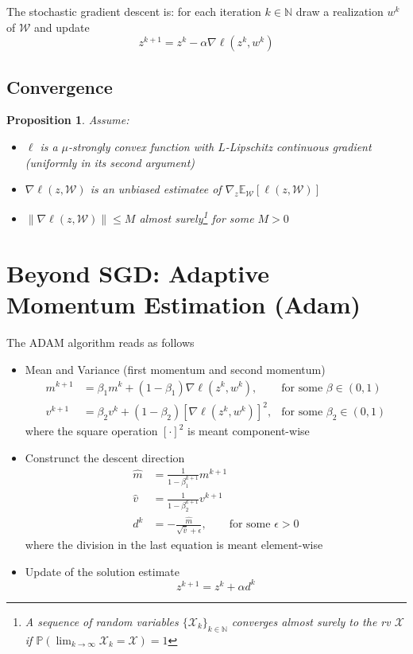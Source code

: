 \documentclass{book}
\newcommand{\N}{\mathbb{N}}
\theoremstyle{theoremv2}
\newtheorem{proposition}{Proposition}[chapter]
\theoremstyle{defv2}
\theoremstyle{remark}
\theoremstyle{remark}
\theoremstyle{definition}
\theoremstyle{definition}
\begin{document}
The stochastic gradient descent is: for each iteration $k\in\N$ draw a realization $w^k$ of $\mathcal{W}$ and update 
\[
    z^{k+1} = z^k -\alpha\nabla\ell(z^k,w^k)
\]
\subsection{Convergence}
\begin{proposition}
    Assume: 
    \begin{itemize}
        \item $\ell$ is a $\mu$-strongly convex function with $L$-Lipschitz continuous gradient (uniformly in its second argument)
        \item $\nabla\ell(z,\mathcal{W})$ is an unbiased estimatee of $\nabla_z\mathbb{E}_{\mathcal{W}}[\ell(z,\mathcal{W})]$
        \item $\|\nabla\ell(z,\mathcal{W})\|\leq M$ almost surely\footnote{A sequence of random variables $\{\mathcal{X}_k\}_{k\in\N}$ converges almost surely to the rv $\mathcal{X}$ if $\mathbb{P}(\lim_{k\to\infty}\mathcal{X}_k=\mathcal{X})=1$} for some $M>0$
    \end{itemize}
\end{proposition} %
\section{Beyond SGD: Adaptive Momentum Estimation (Adam)}
The ADAM algorithm reads as follows
\begin{itemize}
    \item Mean and Variance (first momentum and second momentum)
        \begin{align*}
            m^{k+1} & = \beta_1m^k+(1-\beta_1)\nabla\ell(z^k,w^k), &\text{for some } \beta\in(0,1)\\
            v^{k+1} & = \beta_2v^k+(1-\beta_2)[\nabla\ell(z^k,w^k)]^2, &\text{for some } \beta_2\in(0,1)
        \end{align*}
        where the square operation $[\cdot]^2$ is meant component-wise
    \item Construnct the descent direction
        \begin{align*}
            \hat{m} &= \displaystyle\frac{1}{1-\beta_1^{k+1}}m^{k+1}\\
            \hat{v} &= \displaystyle\frac{1}{1-\beta_2^{k+1}}v^{k+1}\\
            d^k &= -\displaystyle\frac{\hat{m}}{\sqrt{\hat{v}}+\epsilon}, \qquad \text{for some } \epsilon> 0
        \end{align*}
        where the division in the last equation is meant element-wise
    \item Update of the solution estimate 
        \[
            z^{k+1} = z^k + \alpha d^k
        \]
\end{itemize}
\end{document}
